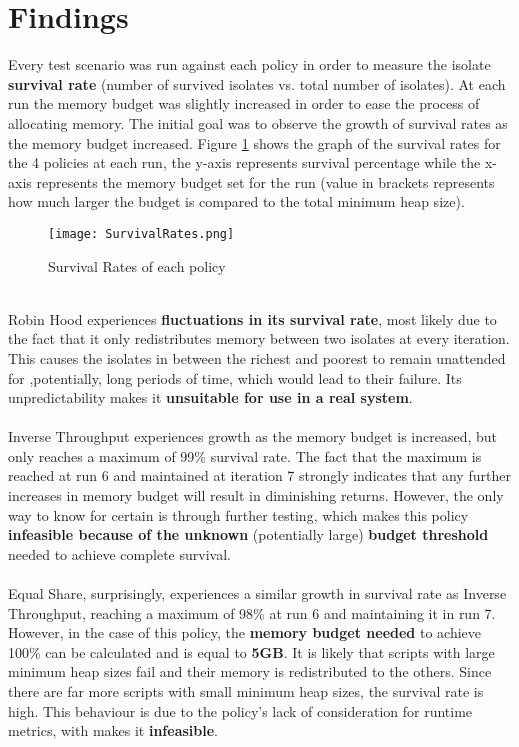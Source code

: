 \documentclass{l4proj}
\begin{document}
\section{Findings}
\hspace*{1em} Every test scenario was run against each policy in order to measure the isolate \textbf{survival rate} (number of survived isolates vs. total number of isolates). At each run the memory budget was slightly increased in order to ease the process of allocating memory. The initial goal was to observe the growth of survival rates as the memory budget increased. Figure \ref{findings} shows the graph of the survival rates for the 4 policies at each run, the y-axis represents survival percentage while the x-axis represents the memory budget set for the run (value in brackets represents how much larger the budget is compared to the total minimum heap size).
\begin{figure}[!ht]
  \centering
    \texttt{[image: SurvivalRates.png]}
    \caption{Survival Rates of each policy}
    \label{findings}
\end{figure}\\
\hspace*{1em} Robin Hood experiences \textbf{fluctuations in its survival rate}, most likely due to the fact that it only redistributes memory between two isolates at every iteration. This causes the isolates in between the richest and poorest to remain unattended for ,potentially, long  periods of time, which would lead to their failure. Its unpredictability makes it \textbf{unsuitable for use in a real system}.
\\\\
\hspace*{1em} Inverse Throughput experiences growth as the memory budget is increased, but only reaches a maximum of 99\% survival rate. The fact that the maximum is reached at run 6 and maintained at iteration 7 strongly indicates that any further increases in memory budget will result in diminishing returns. However, the only way to know for certain is through further testing, which makes this policy \textbf{infeasible because of the unknown} (potentially large) \textbf{budget threshold} needed to achieve complete survival.
\\\\
\hspace*{1em} Equal Share, surprisingly, experiences a similar growth in survival rate as Inverse Throughput, reaching a maximum of 98\% at run 6 and maintaining it in run 7. However, in the case of this policy, the \textbf{memory budget needed} to achieve 100\% can be calculated and is equal to \textbf{5GB}. It is likely that scripts with large minimum heap sizes fail and their memory is redistributed to the others. Since there are far more scripts with small minimum heap sizes, the survival rate is high. This behaviour is due to the policy's lack of consideration for runtime metrics, with makes it \textbf{infeasible}.
\end{document}
